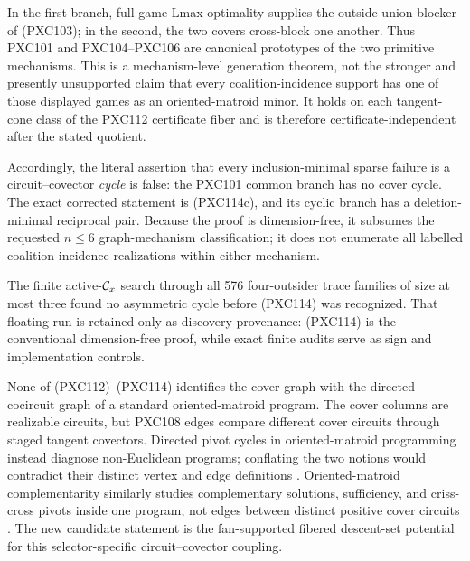 \documentclass[11pt]{article}
\begin{document}
In the first branch, full-game Lmax optimality supplies the outside-union
blocker of (PXC103); in the second, the two covers cross-block one another.
Thus PXC101 and PXC104--PXC106 are canonical prototypes of the two primitive
mechanisms.  This is a mechanism-level generation theorem, not the stronger
and presently unsupported claim that every coalition-incidence support has
one of those displayed games as an oriented-matroid minor.  It holds on each
tangent-cone class of the PXC112 certificate fiber and is therefore
certificate-independent after the stated quotient.

Accordingly, the literal assertion that every inclusion-minimal sparse
failure is a circuit--covector \emph{cycle} is false: the PXC101 common
branch has no cover cycle.  The exact corrected statement is (PXC114c), and
its cyclic branch has a deletion-minimal reciprocal pair.  Because the proof
is dimension-free, it subsumes the requested \(n\le6\) graph-mechanism
classification; it does not enumerate all labelled coalition-incidence
realizations within either mechanism.

The finite active-\({\cal C}_x\) search through all 576 four-outsider trace
families of size at most three found no asymmetric cycle before (PXC114) was
recognized.  That floating run is retained only as discovery provenance:
(PXC114) is the conventional dimension-free proof, while exact finite audits
serve as sign and implementation controls.

None of (PXC112)--(PXC114) identifies the cover graph with the directed
cocircuit graph of a standard oriented-matroid program.  The cover columns
are realizable circuits, but PXC108 edges compare different cover circuits
through staged tangent covectors.  Directed pivot cycles in oriented-matroid
programming instead diagnose non-Euclidean programs; conflating the two
notions would contradict their distinct vertex and edge definitions
\citep{BjornerEtAl1999}.  Oriented-matroid complementarity similarly studies
complementary solutions, sufficiency, and criss-cross pivots inside one
program, not edges between distinct positive cover circuits
\citep{FukudaTerlaky1992}.  The new candidate statement is the fan-supported
fibered
descent-set potential for this selector-specific circuit--covector coupling.
\end{document}
